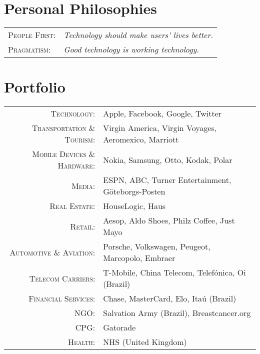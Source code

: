 \documentclass[a4paper,10pt]{article}
\begin{document}
\section{Personal Philosophies}
\begin{tabular}{ll}

  \textsc{People First:} & \emph{Technology should make users' lives
    better.} \\

  \textsc{Pragmatism:} & \emph{Good technology is working technology.}
  
\end{tabular}


\section{Portfolio}

\begin{tabular}{rl}
  \textsc{Technology:} &
    Apple,
    Facebook,
    Google,
    Twitter \\

  \textsc{Transportation \& Tourism:} &
    Virgin America,
    Virgin Voyages,
    Aeromexico,
    Marriott \\

  \textsc{Mobile Devices \& Hardware:} &

    Nokia,
    Samsung,
    Otto,
    Kodak,
    Polar \\

  \textsc{Media:} &

    ESPN,
    ABC,
    Turner Entertainment,
    G\"{o}teborgs-Posten \\

  \textsc{Real Estate:} &

    HouseLogic,
    Haus\\

  \textsc{Retail:} &

    Aesop,
    Aldo Shoes,
    Philz Coffee,
    Just Mayo\\

  \textsc{Automotive \& Aviation:} &

    Porsche,
    Volkswagen,
    Peugeot,
    Marcopolo,
    Embraer\\

  \textsc{Telecom Carriers:} &

    T-Mobile,
    China Telecom,
    Telef\'{o}nica,
    Oi (Brazil)\\

  \textsc{Financial Services:} &

    Chase,
    MasterCard,
    Elo,
    Ita\'{u} (Brazil)\\

  \textsc{NGO:} &

    Salvation Army (Brazil),
    Breastcancer.org\\
    
  \textsc{CPG:} &

    Gatorade\\

  \textsc{Health:} &

    NHS (United Kingdom)
\end{tabular}
\end{document}
